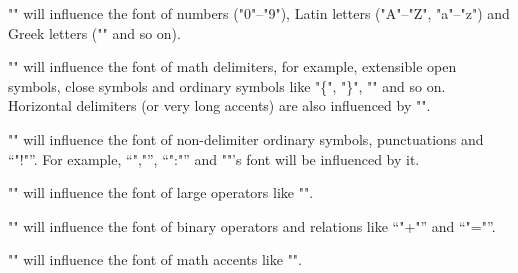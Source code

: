 "\mathalphafontname" will influence the font of numbers ("0"--"9"), Latin 
letters ("A"--"Z", "a"--"z") and Greek letters ("\alpha" and so on). 

"\mathdelimiterfontname" will influence the font of math delimiters, 
for example, extensible open symbols, close symbols and ordinary symbols 
like "\{", "\}", "\vert" and so on. 
Horizontal delimiters (or very long accents) are also influenced by 
"\mathdelimiterfontname".

"\mathordfontname" will influence the font of non-delimiter ordinary 
symbols, punctuations and ``"!"''. For example, ``","'', ``":"'' and 
"\colon"'s font will be influenced by it.

"\mathopfontname" will influence the font of large operators like "\sum".

"\mathbinfontname" will influence the font of binary operators and relations 
like ``"+"'' and ``"="''.

"\mathaccentfontname" will influence the font of math accents like "\dot".



\closeout\tocout
\bye
